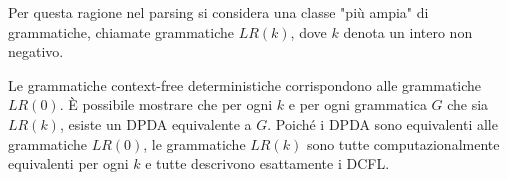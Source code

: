 \vspace{5mm}

Per questa ragione nel parsing si considera una classe "più ampia" di grammatiche, chiamate grammatiche $L R(k)$, dove $k$ denota un intero non negativo.

Le grammatiche context-free deterministiche corrispondono alle grammatiche $L R(0)$.
È possibile mostrare che per ogni $k$ e per ogni grammatica $G$ che sia $L R(k)$, esiste un DPDA equivalente a $G$.
Poiché i DPDA sono equivalenti alle grammatiche $L R(0)$, le grammatiche $L R(k)$ sono tutte computazionalmente equivalenti per ogni $k$ e tutte descrivono esattamente i DCFL.







\let\cleardoublepage\clearpage

